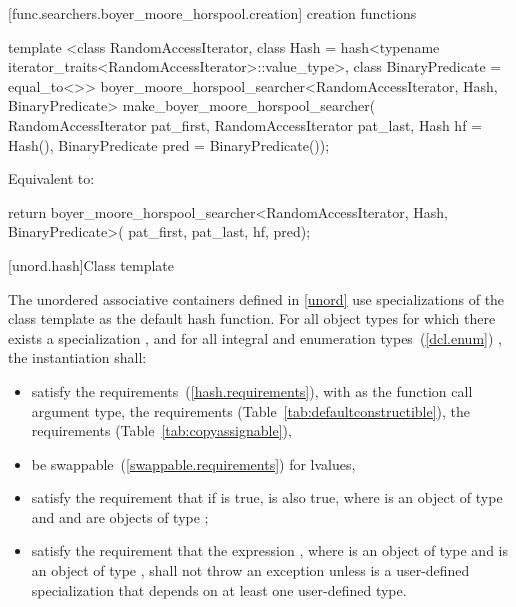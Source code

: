 [func.searchers.boyer_moore_horspool.creation]{ creation functions}

%
\begin{itemdecl}
template <class RandomAccessIterator,
          class Hash = hash<typename iterator_traits<RandomAccessIterator>::value_type>,
          class BinaryPredicate = equal_to<>>
  boyer_moore_horspool_searcher<RandomAccessIterator, Hash, BinaryPredicate>
    make_boyer_moore_horspool_searcher(
      RandomAccessIterator pat_first, RandomAccessIterator pat_last,
      Hash hf = Hash(), BinaryPredicate pred = BinaryPredicate());
\end{itemdecl}

\begin{itemdescr}

\pnum
\effects
Equivalent to:
\begin{codeblock}
return boyer_moore_horspool_searcher<RandomAccessIterator, Hash, BinaryPredicate>(
         pat_first, pat_last, hf, pred);
\end{codeblock}
\end{itemdescr}

[unord.hash]{Class template }

\pnum
{}%
%
The unordered associative containers defined in \ref{unord} use
specializations of the class template  as the default hash function.
For all object types  for which there exists a specialization ,
and for all integral and enumeration types~(\ref{dcl.enum}) ,
the instantiation  shall:

\begin{itemize}
\item satisfy the  requirements~(\ref{hash.requirements}),
with  as the function
call argument type, the  requirements (Table~\ref{tab:defaultconstructible}),
the  requirements (Table~\ref{tab:copyassignable}),
\item be swappable~(\ref{swappable.requirements}) for lvalues,
\item satisfy the requirement that if  is true,  is
also true, where  is an object of type  and  and 
are objects of type ;
\item satisfy the requirement that the expression , where 
is an object of type  and  is an object of type
, shall not throw an exception unless  is a
user-defined specialization that depends on at least one user-defined type.
\end{itemize}

